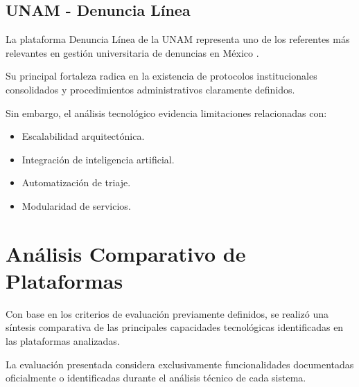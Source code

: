 \subsection{UNAM - Denuncia Línea}

\begin{flushleft}
\justifying

La plataforma Denuncia Línea de la UNAM representa uno de los referentes más relevantes en gestión universitaria de denuncias en México \cite{24}.

Su principal fortaleza radica en la existencia de protocolos institucionales consolidados y procedimientos administrativos claramente definidos.

Sin embargo, el análisis tecnológico evidencia limitaciones relacionadas con:

\begin{itemize}

    \item Escalabilidad arquitectónica.
    \item Integración de inteligencia artificial.
    \item Automatización de triaje.
    \item Modularidad de servicios.

\end{itemize}

\end{flushleft}


\section{Análisis Comparativo de Plataformas}

\begin{flushleft}
\justifying

Con base en los criterios de evaluación previamente definidos, se realizó una síntesis comparativa de las principales capacidades tecnológicas identificadas en las plataformas analizadas.

La evaluación presentada considera exclusivamente funcionalidades documentadas oficialmente o identificadas durante el análisis técnico de cada sistema.

\end{flushleft}

